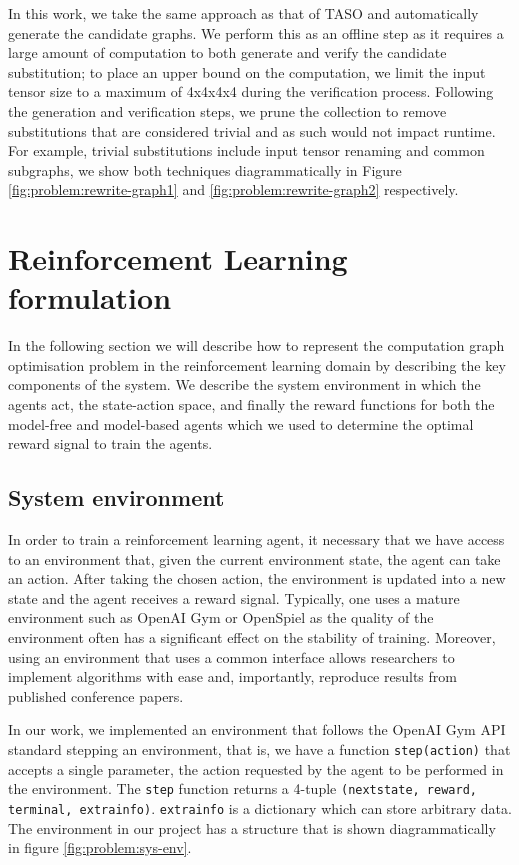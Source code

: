 In this work, we take the same approach as that of TASO and automatically generate the candidate graphs. We perform this as an offline step as it requires a large amount of computation to both generate and verify the candidate substitution; to place an upper bound on the computation, we limit the input tensor size to a maximum of 4x4x4x4 during the verification process. Following the generation and verification steps, we prune the collection to remove substitutions that are considered trivial and as such would not impact runtime. For example, trivial substitutions include input tensor renaming and common subgraphs, we show both techniques diagrammatically in Figure \ref{fig:problem:rewrite-graph1} and \ref{fig:problem:rewrite-graph2} respectively.



\section{Reinforcement Learning formulation}
In the following section we will describe how to represent the computation graph optimisation problem in the reinforcement learning domain by describing the key components of the system. We describe the system environment in which the agents act, the state-action space, and finally the reward functions for both the model-free and model-based agents which we used to determine the optimal reward signal to train the agents.

\subsection{System environment}
\label{sec:prob:subsec:sysenv}

In order to train a reinforcement learning agent, it necessary that we have access to an environment that, given the current environment state, the agent can take an action. After taking the chosen action, the environment is updated into a new state and the agent receives a reward signal. Typically, one uses a mature environment such as OpenAI Gym \cite{brockman2016openai} or OpenSpiel \cite{LanctotEtAl2019OpenSpiel} as the quality of the environment often has a significant effect on the stability of training. Moreover, using an environment that uses a common interface allows researchers to implement algorithms with ease and, importantly, reproduce results from published conference papers.

In our work, we implemented an environment that follows the OpenAI Gym API standard stepping an environment, that is, we have a function \texttt{step(action)} that accepts a single parameter, the action requested by the agent to be performed in the environment. The \texttt{step} function returns a 4-tuple \texttt{(next\textunderscore state, reward, terminal, extra\textunderscore info)}. \texttt{extra\textunderscore info} is a dictionary which can store arbitrary data. The environment in our project has a structure that is shown diagrammatically in figure \ref{fig:problem:sys-env}.

